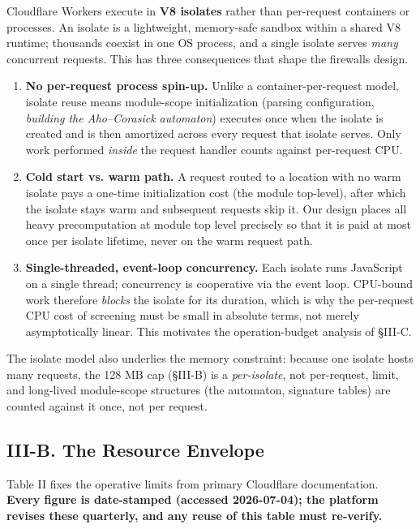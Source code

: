 Cloudflare Workers execute in \textbf{V8 isolates} rather than
per-request containers or processes. An isolate is a lightweight,
memory-safe sandbox within a shared V8 runtime; thousands coexist in one
OS process, and a single isolate serves \emph{many} concurrent requests.
This has three consequences that shape the firewall\textquotesingle s
design.

\begin{enumerate}
\def\labelenumi{\arabic{enumi}.}
\tightlist
\item
  \textbf{No per-request process spin-up.} Unlike a
  container-per-request model, isolate reuse means module-scope
  initialization (parsing configuration, \emph{building the
  Aho--Corasick automaton}) executes once when the isolate is created
  and is then amortized across every request that isolate serves. Only
  work performed \emph{inside} the request handler counts against
  per-request CPU.
\item
  \textbf{Cold start vs. warm path.} A request routed to a location with
  no warm isolate pays a one-time initialization cost (the module
  top-level), after which the isolate stays warm and subsequent requests
  skip it. Our design places all heavy precomputation at module top
  level precisely so that it is paid at most once per isolate lifetime,
  never on the warm request path.
\item
  \textbf{Single-threaded, event-loop concurrency.} Each isolate runs
  JavaScript on a single thread; concurrency is cooperative via the
  event loop. CPU-bound work therefore \emph{blocks} the isolate for its
  duration, which is why the per-request CPU cost of screening must be
  small in absolute terms, not merely asymptotically linear. This
  motivates the operation-budget analysis of §III-C.
\end{enumerate}

The isolate model also underlies the memory constraint: because one
isolate hosts many requests, the 128 MB cap (§III-B) is a
\emph{per-isolate}, not per-request, limit, and long-lived module-scope
structures (the automaton, signature tables) are counted against it
once, not per request.

\subsection{III-B. The Resource
Envelope}\label{iii-b-the-resource-envelope}

Table II fixes the operative limits from primary Cloudflare
documentation. \textbf{Every figure is date-stamped (accessed
2026-07-04); the platform revises these quarterly, and any reuse of this
table must re-verify.}

